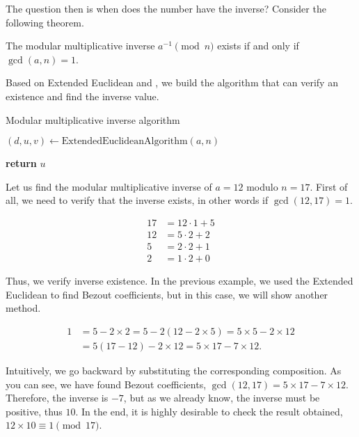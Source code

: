 \documentclass[../lecture-notes-148x210.tex]{subfiles}
\begin{document}
The question then is when does the number have the inverse? Consider the following theorem.

\begin{theorem}\label{th:inverse_existence}
    The modular multiplicative inverse $a^{-1} \pmod{n}$ exists if and only if $\gcd(a, n) = 1$.
\end{theorem}

Based on Extended Euclidean  and , we build the algorithm that can verify an existence and find the inverse value.

\begin{algorithm}[H]
    \caption{Modular multiplicative inverse algorithm} \label{alg:modular_inverse}
        
    $(d, u, v) \gets \text{ExtendedEuclideanAlgorithm}(a, n)$ 


    \textbf{return} $u$
\end{algorithm}

\begin{example}
    Let us find the modular multiplicative inverse of $a = 12$ modulo $n = 17$.
    First of all, we need to verify that the inverse exists, in other words if $\gcd(12, 17) = 1$.

    \begin{equation*}   
        \begin{aligned}
            17 &= 12 \cdot 1 + 5 \\
            12 &= 5 \cdot 2 + 2 \\
            5 &= 2 \cdot 2 + 1 \\
            2 &= 1 \cdot 2 + 0
        \end{aligned}
    \end{equation*}

    Thus, we verify inverse existence. In the previous example, we used 
    the Extended Euclidean  to find Bezout coefficients,
    but in this case, we will show another method.

    \begin{equation*}
        \begin{aligned}
            1 &= 5 - 2 \times 2 = 5 - 2(12 - 2 \times 5) = 5 \times 5 - 2 \times 12 \\
              &= 5(17 - 12) - 2 \times 12 = 5 \times 17 - 7 \times 12.
        \end{aligned}
    \end{equation*}

    Intuitively, we go backward by substituting the corresponding composition.
    As you can see, we have found Bezout coefficients, $\gcd(12, 17) = 5 \times 17 - 7 \times 12$.
    Therefore, the inverse is $-7$, but as we already know, the inverse must be positive, thus $10$.
    In the end, it is highly desirable to check the result obtained,~$12 \times 10 \equiv 1 \pmod{17}$.

\end{example}
\end{document}
